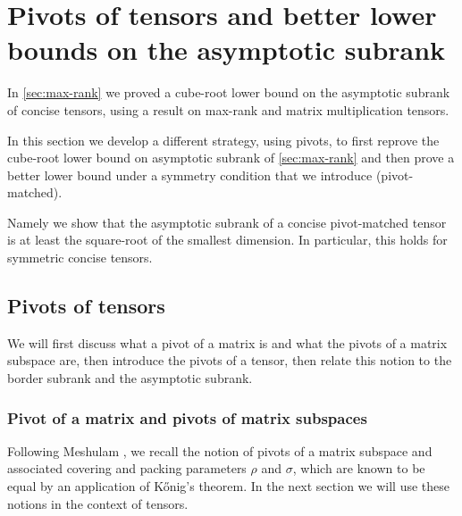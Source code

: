 \documentclass{daj}
\begin{document}
\section{Pivots of tensors and better lower bounds on the asymptotic subrank}\label{sec:lower-bound-asympsubrank}

In \autoref{sec:max-rank} we proved a cube-root lower bound on the asymptotic subrank of concise tensors, using a result on max-rank and matrix multiplication tensors.

In this section we develop a different strategy, using pivots, to first reprove the cube-root lower bound on asymptotic subrank of \autoref{sec:max-rank} and then prove a better lower bound under a symmetry condition that we introduce (pivot-matched).

%
%
%

%

Namely we show that the asymptotic subrank of a concise pivot-matched tensor is at least the square-root of the smallest dimension. In particular, this holds for symmetric concise tensors. %

%

%
%

%

%
%
%

%

%
%
%

%
%
%
%
%
%
%
%
%


%
%
%
%
%
%

%
%
%
%
%
%
%
%
%
%


%

%

\subsection{Pivots of tensors}
We will first discuss what a pivot of a matrix is and what the pivots of a matrix subspace are, then introduce the pivots of a tensor, then relate this notion to the border subrank and the asymptotic subrank.

\subsubsection{Pivot of a matrix and pivots of matrix subspaces}

Following Meshulam \cite{meshulam1985maximal}, we recall the notion of pivots of a matrix subspace and associated covering and packing parameters $\rho$ and $\sigma$, which are known to be equal by an application of Kőnig's theorem. In the next section we will use these notions in the context of tensors.
\end{document}
